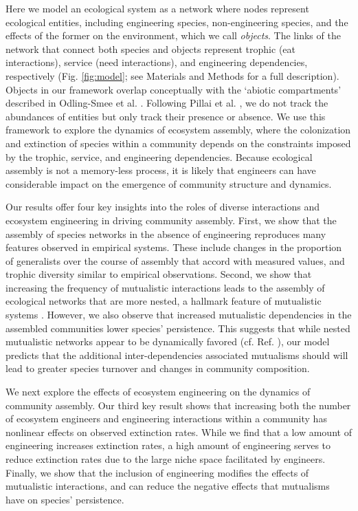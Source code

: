 \documentclass[9pt,twocolumn,twoside]{pnas-new}
\begin{document}
Here we model an ecological system as a network where nodes represent ecological entities, including engineering species, non-engineering species, and the effects of the former on the environment, which we call \emph{objects}.
The links of the network that connect both species and objects represent trophic (eat interactions), service (need interactions), and engineering dependencies, respectively (Fig. \ref{fig:model}; see Materials and Methods for a full description).
Objects in our framework overlap conceptually with the `abiotic compartments' described in Odling-Smee et al. \cite{OdlingSmee2013}.
Following Pillai et al. \cite{Pillai2011}, we do not track the abundances of entities but only track their presence or absence.
We use this framework to explore the dynamics of ecosystem assembly, where the colonization and extinction of species within a community depends on the constraints imposed by the trophic, service, and engineering dependencies.
Because ecological assembly is not a memory-less process, it is likely that engineers can have considerable impact on the emergence of community structure and dynamics.

Our results offer four key insights into the roles of diverse interactions and ecosystem engineering in driving community assembly.
First, we show that the assembly of species networks in the absence of engineering reproduces many features observed in empirical systems.
These include changes in the proportion of generalists over the course of assembly that accord with measured values, and trophic diversity similar to empirical observations. %
Second, we show that increasing the frequency of mutualistic interactions leads to the assembly of ecological networks that are more nested, a hallmark feature of mutualistic systems \cite{Bascompte2003}.
However, we also observe that increased mutualistic dependencies in the assembled communities lower species' persistence.
This suggests that while nested mutualistic networks appear to be dynamically favored (cf. Ref. ), our model predicts that the additional inter-dependencies associated mutualisms should will lead to greater species turnover and changes in community composition.

We next explore the effects of ecosystem engineering on the dynamics of community assembly.
Our third key result shows that increasing both the number of ecosystem engineers and engineering interactions within a community has nonlinear effects on observed extinction rates.
While we find that a low amount of engineering increases extinction rates, a high amount of engineering serves to reduce extinction rates due to the large niche space facilitated by engineers.
Finally, we show that the inclusion of engineering modifies the effects of mutualistic interactions, and can reduce the negative effects that mutualisms have on species' persistence.\\
\end{document}
